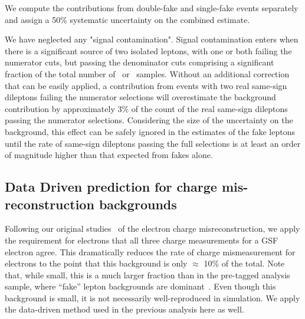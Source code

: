 We compute the contributions from double-fake and single-fake events separately and assign a 50\% systematic
uncertainty on the combined estimate.

We have neglected any "signal contamination". 
Signal contamination enters when there is a significant
source of two isolated leptons, with one or both failing the numerator cuts, but passing the denominator cuts
comprising  a significant fraction of the total number of \nNoNu\ or \nNoNo\ samples. 
Without an additional correction that can be easily applied,
a contribution from events with two real same-sign dileptons failing the numerator selections
 will overestimate the background contribution by approximately 3\% of the count of
the real same-sign dileptons passing the numerator selections.
Considering the size of the uncertainty on the background,
this effect can be safely ignored in the estimates 
of the fake leptons until the rate of same-sign dileptons passing the full
selections is at least an order of magnitude  higher than that expected
from fakes alone.


\subsection{Data Driven prediction for charge mis-reconstruction backgrounds}
\label{sec:flips}


Following our original studies~\cite{sspaper2010} of the electron charge misreconstruction, 
we apply the requirement for electrons that all three charge measurements for a GSF electron agree. 
This dramatically reduces the rate of charge mismeasurement for electrons to
the point that this background is only $\approx$ 10\% of the total.  Note 
that, while small, this is a much larger fraction than in
the pre-tagged analysis sample, where ``fake'' lepton backgrounds are
dominant~\cite{sspaper2010,sspaper2011,ssnote2011}.
Even though this background is small, it is not necessarily 
well-reproduced in simulation.
We apply the data-driven method used in the previous 
analysis\cite{sspaper2010,sspaper2011,ssnote2011}
here
as well.

